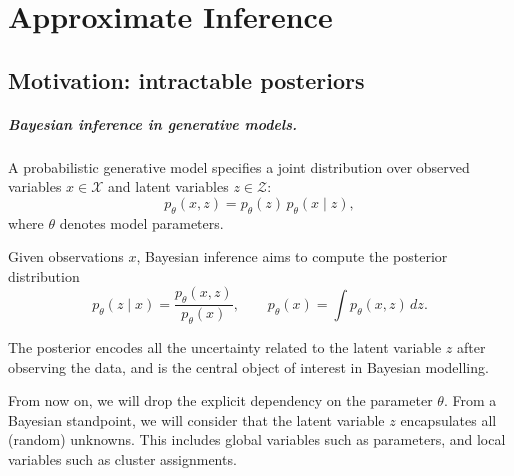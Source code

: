 \chapter{Approximate Inference}


\section{Motivation: intractable posteriors}

\paragraph{Bayesian inference in generative models.} A probabilistic generative model specifies a joint distribution over observed variables
\(x \in \mathcal X\) and latent variables \(z \in \mathcal Z\):
\[
p_\theta(x,z) = p_\theta(z)\,p_\theta(x \mid z),
\]
where \(\theta\) denotes model parameters.

Given observations \(x\), Bayesian inference aims to compute the posterior distribution
\[
p_\theta(z \mid x) = \frac{p_\theta(x,z)}{p_\theta(x)},
\qquad
p_\theta(x) = \int p_\theta(x,z)\,dz.
\]

The posterior encodes all the uncertainty related to the latent variable \(z\) after observing the data, and is the central object of interest in Bayesian modelling.

\begin{remark}
    From now on, we will drop the explicit dependency on the parameter $\theta$. From a Bayesian standpoint, we will consider that the latent variable $z$ encapsulates all (random) unknowns. This includes global variables such as parameters, and local variables such as cluster assignments. 
\end{remark}

